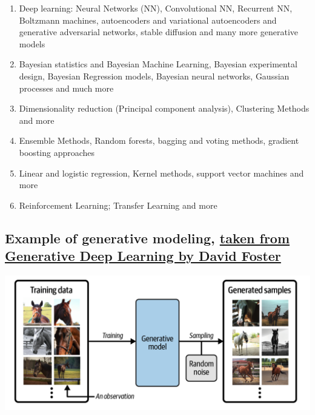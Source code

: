 \documentclass[%
oneside,                 %
final,                   %
10pt]{article}
\begin{document}
\begin{enumerate}
\item Deep learning: Neural Networks (NN), Convolutional NN, Recurrent NN, Boltzmann machines, autoencoders and variational autoencoders  and generative adversarial networks, stable diffusion and many more generative models

\item Bayesian statistics and Bayesian Machine Learning, Bayesian experimental design, Bayesian Regression models, Bayesian neural networks, Gaussian processes and much more

\item Dimensionality reduction (Principal component analysis), Clustering Methods and more

\item Ensemble Methods, Random forests, bagging and voting methods, gradient boosting approaches 

\item Linear and logistic regression, Kernel methods, support vector machines and more

\item Reinforcement Learning; Transfer Learning and more 
\end{enumerate}

\noindent
\subsection{Example of generative modeling, \href{{https://www.oreilly.com/library/view/generative-deep-learning/9781098134174/ch01.html}}{taken from Generative Deep Learning by David Foster}}

\vspace{6mm}

\centerline{\includegraphics[width=1.0\linewidth]{figures/generativelearning.png}}

\vspace{6mm}
\end{document}
